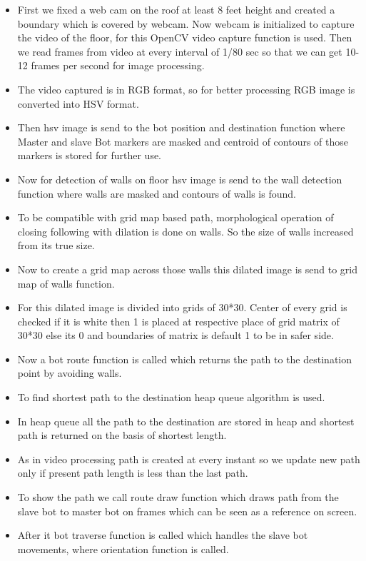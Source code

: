 \documentclass[report]{res}
\begin{document}
	\begin{itemize}
		\item First we fixed a web cam on the roof at least 8 feet height and created a boundary which is covered by webcam. Now webcam is initialized to capture the video of the floor, for this OpenCV video capture function is used. Then we read frames from video at every interval of 1/80 sec so that we can get 10-12 frames per second for image processing. 
		\item The video captured is in RGB format, so for better processing RGB image is converted into HSV format.
		\item Then hsv image is send to the bot position and destination function where Master and slave Bot markers are masked and centroid of contours of those markers is stored for further use. 
		\item Now for detection of walls on floor hsv image is send to the wall detection function where walls are masked and contours of walls is found. 
		\item To be compatible with grid map based path, morphological operation of closing following with dilation is done on walls. So the size of walls increased from its true size. 
		\item Now to create a grid map across those walls this dilated image is send to grid map of walls function. 
		\item For this dilated image is divided into grids of 30*30. Center of every grid is checked if it is white then 1 is placed at respective place of grid matrix of 30*30 else its 0 and boundaries of matrix is default 1 to be in safer side. 
		\item Now a bot route function is called which returns the path to the destination point by avoiding walls. 
		\item To find shortest path to the destination heap queue algorithm is used. 
		\item In heap queue all the path to the destination are stored in heap and shortest path is returned on the basis of shortest length. 
		\item As in video processing path is created at every instant so we update new path only if present path length is less than the last path. 
		\item To show the path we call route draw function which draws path from the slave bot to master bot on frames which can be seen as a reference on screen. 
		\item After it bot traverse function is called which handles the slave bot movements, where orientation function is called. 

\end{itemize}
\end{document}
